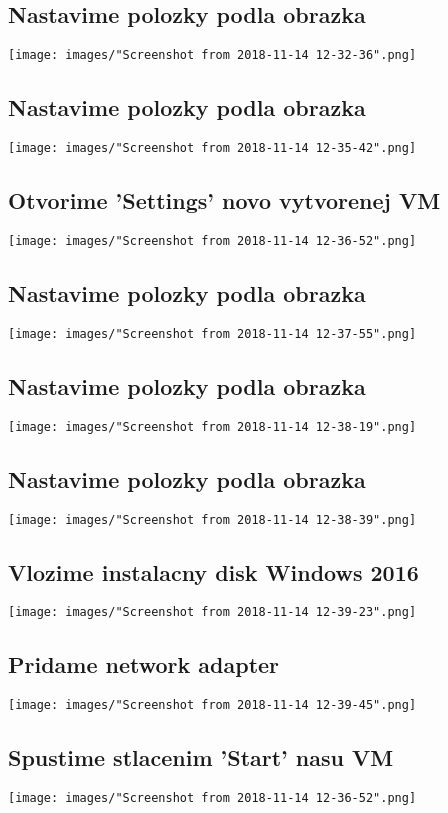 \documentclass[slovak]{article}
\begin{document}
  \subsection{Nastavime polozky podla obrazka}
  \texttt{[image: images/"Screenshot from 2018-11-14 12-32-36".png]}
  \subsection{Nastavime polozky podla obrazka}
  \texttt{[image: images/"Screenshot from 2018-11-14 12-35-42".png]}
  \subsection{Otvorime 'Settings' novo vytvorenej VM}
  \texttt{[image: images/"Screenshot from 2018-11-14 12-36-52".png]}
  \subsection{Nastavime polozky podla obrazka}
  \texttt{[image: images/"Screenshot from 2018-11-14 12-37-55".png]}
  \subsection{Nastavime polozky podla obrazka}
  \texttt{[image: images/"Screenshot from 2018-11-14 12-38-19".png]}
  \subsection{Nastavime polozky podla obrazka}
  \texttt{[image: images/"Screenshot from 2018-11-14 12-38-39".png]}
  \subsection{Vlozime instalacny disk Windows 2016}
  \texttt{[image: images/"Screenshot from 2018-11-14 12-39-23".png]}
  \subsection{Pridame network adapter}
  \texttt{[image: images/"Screenshot from 2018-11-14 12-39-45".png]}
  \subsection{Spustime stlacenim 'Start' nasu VM}
  \texttt{[image: images/"Screenshot from 2018-11-14 12-36-52".png]}
\end{document}
